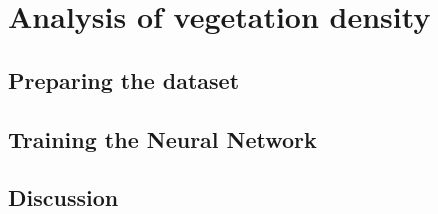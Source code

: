 \section{Analysis of vegetation density}

\subsection{Preparing the dataset}

\subsection{Training the Neural Network}

\subsection{Discussion}

\newpage

